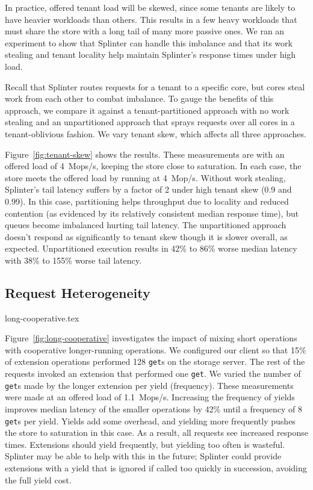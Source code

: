 In practice, offered tenant load will be skewed, since some tenants are likely
  to have heavier workloads than others.
This results in a few heavy workloads that must share the store with a long
  tail of many more passive ones.
We ran an experiment to show that Splinter can handle this imbalance and
  that its work stealing and tenant locality help maintain Splinter's
  response times under high load.

Recall that Splinter routes requests for a tenant to a specific
  core, but cores steal work from each other to combat imbalance.
To gauge the benefits of this approach, we compare it against a tenant-partitioned
  approach with no work stealing and an unpartitioned approach that sprays
  requests over all cores in a tenant-oblivious fashion.
We vary tenant skew, which affects all three approaches.

Figure~\ref{fig:tenant-skew} shows the results.
These measurements are with an offered load of 4~Mops/s, keeping the
  store close to saturation.
In each case, the store meets the offered load by running at
  4~Mop/s.
Without work stealing, Splinter's tail latency suffers by a factor of 2 under
  high tenant skew (0.9 and 0.99).
In this case, partitioning helps throughput due to locality and reduced
  contention (as evidenced by its relatively consistent median response time),
  but queues become imbalanced hurting tail latency.
The unpartitioned approach doesn't respond as significantly to tenant skew
  though it is slower overall, as expected.
Unpartitioned execution results in
  42\% to 86\% worse median latency with 38\% to 155\% worse tail latency.

\subsection{Request Heterogeneity}

 {long-cooperative.tex}

Figure~\ref{fig:long-cooperative} investigates the impact of mixing short operations
with cooperative longer-running operations.
We configured our client so that
15\% of extension operations performed
128 \texttt{get}s on the storage server. The rest of the
requests invoked an extension that performed one \texttt{get}.
We varied the number of \texttt{get}s made by the longer
extension per yield (frequency).
These measurements were made at an offered load of 1.1~Mops/s.
Increasing the frequency of yields improves median
latency of the smaller operations by 42\% until a frequency of 8 \texttt{get}s per
yield.
Yields add some overhead, and yielding more frequently pushes the store to
  saturation in this case.
As a result, all requests see increased response times.
Extensions should yield frequently, but
yielding too often is wasteful.
Splinter may be able to help with this in the future; Splinter could provide
  extensions with a yield that is ignored if called too quickly in succession,
  avoiding the full yield cost.

